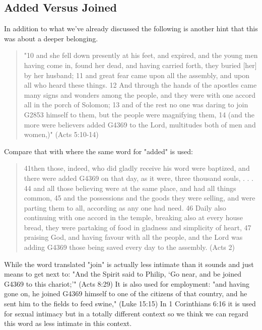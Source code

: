 \documentclass[11pt]{article}
\begin{document}
\subsection{Added Versus Joined} \label{added versus joined}
In addition to what we've already discussed the following is another hint that this was about a deeper belonging.
\begin{quote}
"10 and she fell down presently at his feet, and expired, and the young men having come in, found her dead, and having carried forth, they buried [her] by her husband;
11 and great fear came upon all the assembly, and upon all who heard these things.
12 And through the hands of the apostles came many signs and wonders among the people, and they were with one accord all in the porch of Solomon;
13 and of the rest no one was daring to join G2853 himself to them, but the people were magnifying them,
14 (and the more were believers added G4369 to the Lord, multitudes both of men and women,)" (Acts 5:10-14)
\end{quote}
Compare that with where the same word for "added" is used:
\begin{quote}
 41then those, indeed, who did gladly receive his word were baptized, and there were added G4369 on that day, as it were, three thousand souls, . . .
44 and all those believing were at the same place, and had all things common,
45 and the possessions and the goods they were selling, and were parting them to all, according as any one had need.
46 Daily also continuing with one accord in the temple, breaking also at every house bread, they were partaking of food in gladness and simplicity of heart,
47 praising God, and having favour with all the people, and the Lord was adding G4369 those being saved every day to the assembly. (Acts 2)
\end{quote}

While the word translated "join" is actually less intimate than it sounds and just means to get next to:
"And the Spirit said to Philip, `Go near, and be joined G4369 to this chariot;'"
(Acts 8:29)
It is also used for employment:
"and having gone on, he joined G4369 himself to one of the citizens of that country, and he sent him to the fields to feed swine,"
(Luke 15:15)
In 1 Corinthians 6:16 it is used for sexual intimacy but in a totally different context so we think we can regard this word as less intimate in this context.
\end{document}
